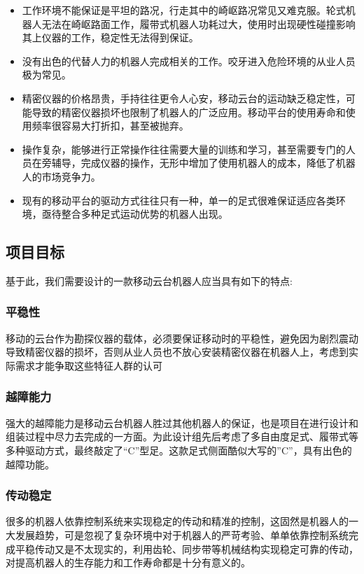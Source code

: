 \documentclass[12pt]{article}
\begin{document}
\begin{CJK}{UTF8}{song}
\begin{itemize}
\item 工作环境不能保证是平坦的路况，行走其中的崎岖路况常见又难克服。轮式机器人无法在崎岖路面工作，履带式机器人功耗过大，使用时出现硬性碰撞影响其上仪器的工作，稳定性无法得到保证。
\item 没有出色的代替人力的机器人完成相关的工作。咬牙进入危险环境的从业人员极为常见。
\item 精密仪器的价格昂贵，手持往往更令人心安，移动云台的运动缺乏稳定性，可能导致的精密仪器损坏也限制了机器人的广泛应用。移动平台的使用寿命和使用频率很容易大打折扣，甚至被抛弃。
\item 操作复杂，能够进行正常操作往往需要大量的训练和学习，甚至需要专门的人员在旁辅导，完成仪器的操作，无形中增加了使用机器人的成本，降低了机器人的市场竞争力。
\item 现有的移动平台的驱动方式往往只有一种，单一的足式很难保证适应各类环境，亟待整合多种足式运动优势的机器人出现。

\end{itemize}



\subsection{项目目标}
\label{sec:features}
基于此，我们需要设计的一款移动云台机器人应当具有如下的特点:

\subsubsection{平稳性}
\label{sec:requirements}
移动的云台作为勘探仪器的载体，必须要保证移动时的平稳性，避免因为剧烈震动导致精密仪器的损坏，否则从业人员也不放心安装精密仪器在机器人上，考虑到实际需求才能争取这些特征人群的认可

\subsubsection{越障能力}
\label{sec:layout}
强大的越障能力是移动云台机器人胜过其他机器人的保证，也是项目在进行设计和组装过程中尽力去完成的一方面。为此设计组先后考虑了多自由度足式、履带式等多种驱动方式，最终敲定了“C”型足。这款足式侧面酷似大写的”C”，具有出色的越障功能。

\subsubsection{传动稳定}
\label{sec:format}

很多的机器人依靠控制系统来实现稳定的传动和精准的控制，这固然是机器人的一大发展趋势，可是忽视了复杂环境中对于机器人的严苛考验、单单依靠控制系统完成平稳传动又是不太现实的，利用齿轮、同步带等机械结构实现稳定可靠的传动，对提高机器人的生存能力和工作寿命都是十分有意义的。

\end{CJK}
\end{document}
